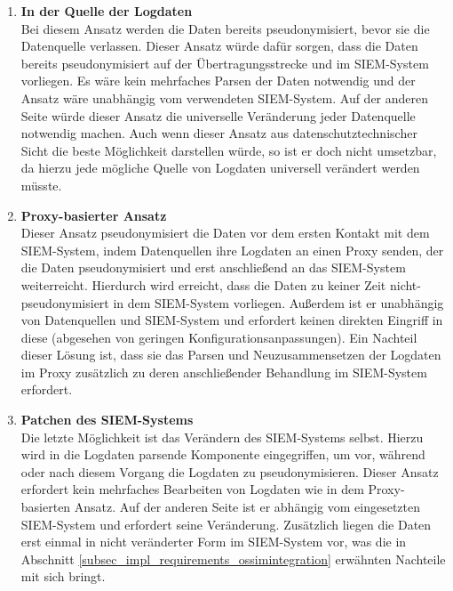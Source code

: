 \begin{enumerate}

\item \textbf{In der Quelle der Logdaten}\\
  Bei diesem Ansatz werden die Daten bereits pseudonymisiert, bevor sie die Datenquelle verlassen. Dieser Ansatz würde dafür sorgen, dass die Daten bereits pseudonymisiert auf der Übertragungsstrecke und im SIEM-System vorliegen. Es wäre kein mehrfaches Parsen der Daten notwendig und der Ansatz wäre unabhängig vom verwendeten SIEM-System. Auf der anderen Seite würde dieser Ansatz die universelle Veränderung jeder Datenquelle notwendig machen. 
  Auch wenn dieser Ansatz aus datenschutztechnischer Sicht die beste Möglichkeit darstellen würde, so ist er doch nicht umsetzbar, da hierzu jede mögliche Quelle von Logdaten universell verändert werden müsste.

\item \textbf{Proxy-basierter Ansatz}\\
  Dieser Ansatz pseudonymisiert die Daten vor dem ersten Kontakt mit dem SIEM-System, indem Datenquellen ihre Logdaten an einen Proxy senden, der die Daten pseudonymisiert und erst anschließend an das SIEM-System weiterreicht. Hierdurch wird erreicht, dass die Daten zu keiner Zeit nicht-pseudonymisiert in dem SIEM-System vorliegen. Außerdem ist er unabhängig von Datenquellen und SIEM-System und erfordert keinen direkten Eingriff in diese (abgesehen von geringen Konfigurationsanpassungen). Ein Nachteil dieser Lösung ist, dass sie das Parsen und Neuzusammensetzen der Logdaten im Proxy zusätzlich zu deren anschließender Behandlung im SIEM-System erfordert.

\item \textbf{Patchen des SIEM-Systems}\\
  Die letzte Möglichkeit ist das Verändern des SIEM-Systems selbst. Hierzu wird in die Logdaten parsende Komponente eingegriffen, um vor, während oder nach diesem Vorgang die Logdaten zu pseudonymisieren. Dieser Ansatz erfordert kein mehrfaches Bearbeiten von Logdaten wie in dem Proxy-basierten Ansatz. Auf der anderen Seite ist er abhängig vom eingesetzten SIEM-System und erfordert seine Veränderung. Zusätzlich liegen die Daten erst einmal in nicht veränderter Form im SIEM-System vor, was die in Abschnitt \ref{subsec_impl_requirements_ossimintegration} erwähnten Nachteile mit sich bringt.

\end{enumerate}

